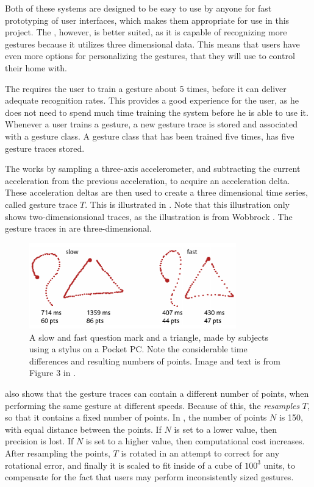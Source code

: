 Both of these systems are designed to be easy to use by anyone for fast prototyping of user interfaces, 
which makes them appropriate for use in this project.
The \threedollar, however, is better suited, 
as it is capable of recognizing more gestures because it utilizes three dimensional data.
This means that users have even more options for personalizing the gestures, 
that they will use to control their home with.

The \threedollar requires the user to train a gesture about \num{5} times, 
before it can deliver adequate recognition rates. 
This provides a good experience for the user, 
as he does not need to spend much time training the system before he is able to use it.
Whenever a user trains a gesture, 
a new gesture trace is stored and associated with a gesture class. 
A gesture class that has been trained five times, 
has five gesture traces stored.

The \threedollar works by sampling a three-axis accelerometer, 
and subtracting the current acceleration from the previous acceleration, 
to acquire an acceleration delta.
These acceleration deltas are then used to create a three dimensional time series, 
called gesture trace $T$.
This is illustrated in . 
Note that this illustration only shows two-dimensionsional traces, 
as the illustration is from Wobbrock \etal \cite{wobbrock2007gestures}.
The gesture traces in \cite{threedollar} are three-dimensional. 

\begin{figure}[!htb]
	\centering
	\includegraphics[width=0.8\textwidth]{images/1-dollar-gesturetrace.png}
	\caption{A slow and fast question mark and a triangle, made by subjects using a stylus on a Pocket PC. Note the considerable time differences and resulting numbers of points. Image and text is from Figure 3 in \protect\cite{wobbrock2007gestures}.}
	\label{fig:onedollar-gesturetrace}
\end{figure}

 also shows that the gesture traces can contain a different number of points, 
when performing the same gesture at different speeds.
Because of this, the \threedollar \emph{resamples} $T$, 
so that it contains a fixed number of points. 
In \cite{threedollar}, the number of points $N$ is \num{150}, 
with equal distance between the points.
If $N$ is set to a lower value, then precision is lost. 
If $N$ is set to a higher value, then computational cost increases.
After resampling the points, 
$T$ is rotated in an attempt to correct for any rotational error, 
and finally it is scaled to fit inside of a cube of $100^3$ units, 
to compensate for the fact that users may perform inconsistently sized gestures.



